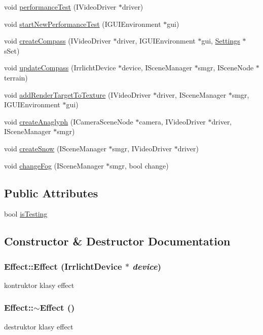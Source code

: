 \begin{DoxyCompactItemize}
\item 
void \hyperlink{class_effect_aea40ea8492461bdfbce75a4375dae68e}{performanceTest} (IVideoDriver $\ast$driver)
\item 
void \hyperlink{class_effect_a47bc7316ae643fa6daa5d196327ec3c1}{startNewPerformanceTest} (IGUIEnvironment $\ast$gui)
\item 
void \hyperlink{class_effect_afcda3f5ed73f16f0697b0467393b21eb}{createCompass} (IVideoDriver $\ast$driver, IGUIEnvironment $\ast$gui, \hyperlink{struct_settings}{Settings} $\ast$sSet)
\item 
void \hyperlink{class_effect_a1c3d763f5bc0790784ba162c3942957d}{updateCompass} (IrrlichtDevice $\ast$device, ISceneManager $\ast$smgr, ISceneNode $\ast$terrain)
\item 
void \hyperlink{class_effect_a9074339b40d0ed9a652317d72e271cb9}{addRenderTargetToTexture} (IVideoDriver $\ast$driver, ISceneManager $\ast$smgr, IGUIEnvironment $\ast$gui)
\item 
void \hyperlink{class_effect_a0704d97e705b722eec5fd93244ae6bcd}{createAnaglyph} (ICameraSceneNode $\ast$camera, IVideoDriver $\ast$driver, ISceneManager $\ast$smgr)
\item 
void \hyperlink{class_effect_aed73faf10c02bbfeb0e2d5d6f664790e}{createSnow} (ISceneManager $\ast$smgr, IVideoDriver $\ast$driver)
\item 
void \hyperlink{class_effect_a19342fd47bfcfa672249faee1f2ed646}{changeFog} (ISceneManager $\ast$smgr, bool change)
\end{DoxyCompactItemize}
\subsection*{Public Attributes}
\begin{DoxyCompactItemize}
\item 
bool \hyperlink{class_effect_a97bca2df55a7bed5e0045d7442fe1601}{isTesting}
\end{DoxyCompactItemize}


\subsection{Constructor \& Destructor Documentation}
\hypertarget{class_effect_ac86f3543fc587821d73c6c7c2ab1004e}{
\subsubsection[{Effect}]{\setlength{\rightskip}{0pt plus 5cm}Effect::Effect (IrrlichtDevice $\ast$ {\em device})}}
\label{class_effect_ac86f3543fc587821d73c6c7c2ab1004e}
kontruktor klasy effect \hypertarget{class_effect_ac26c0a394247e14c9081f875522b5b66}{
\subsubsection[{$\sim$Effect}]{\setlength{\rightskip}{0pt plus 5cm}Effect::$\sim$Effect ()}}
\label{class_effect_ac26c0a394247e14c9081f875522b5b66}
destruktor klasy effect 


